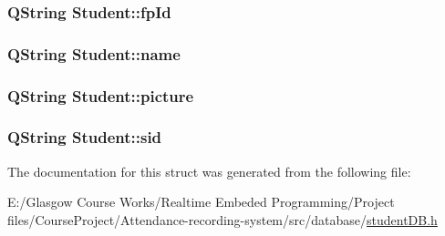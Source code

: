 \subsubsection[{fp\+Id}]{\setlength{\rightskip}{0pt plus 5cm}Q\+String Student\+::fp\+Id}\label{struct_student_a3052ca2dcf48134a6fa8b609e88b2ede}
\hypertarget{struct_student_a51657798a957fca44cd4dbf6de45a13b}{}
\subsubsection[{name}]{\setlength{\rightskip}{0pt plus 5cm}Q\+String Student\+::name}\label{struct_student_a51657798a957fca44cd4dbf6de45a13b}
\hypertarget{struct_student_af7e475f4c1348b582ce20378524fbea3}{}
\subsubsection[{picture}]{\setlength{\rightskip}{0pt plus 5cm}Q\+String Student\+::picture}\label{struct_student_af7e475f4c1348b582ce20378524fbea3}
\hypertarget{struct_student_a8d3097060ba620bf83b2f308422100b7}{}
\subsubsection[{sid}]{\setlength{\rightskip}{0pt plus 5cm}Q\+String Student\+::sid}\label{struct_student_a8d3097060ba620bf83b2f308422100b7}


The documentation for this struct was generated from the following file\+:\begin{DoxyCompactItemize}
\item 
E\+:/\+Glasgow Course Works/\+Realtime Embeded Programming/\+Project files/\+Course\+Project/\+Attendance-\/recording-\/system/src/database/\hyperlink{student_d_b_8h}{student\+D\+B.\+h}\end{DoxyCompactItemize}
